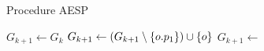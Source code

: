 \begin{algorithm}
  \caption{Procedure AESP}\label{alg:aesp}
  \begin{algorithmic}[1]
    \State $G_{k+1} \gets G_k$
          \State $G_{k+1} \gets \left(G_{k+1} \setminus \{ o.p_1 \}\right) \cup \{ o \}$
        \EndIf
      \Else
        \State  $G_{k+1} \gets$ 
        \EndIf
      \EndIf
    \EndFor
  \EndProcedure
  \end{algorithmic}
\end{algorithm}
